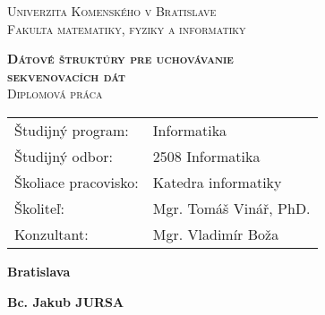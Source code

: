 \newpage
\thispagestyle{empty}

\begin{center}
    \large{
        \textsc{
            Univerzita Komenského v Bratislave \\
            Fakulta matematiky, fyziky a informatiky
        }
    }
\end{center}

\vspace{5cm}

\begin{center}
    \LARGE{
        \textbf{
            \textsc{
                Dátové štruktúry pre uchovávanie \\
                sekvenovacích dát \\
            }
        }
    }
    \vspace{1cm}
    \large{
        \textsc{
            Diplomová práca
        }
    }
\end{center}

\vfill

\begin{center}
    \begin{tabular}{ll}
        Študijný program:               &   Informatika \\
        Študijný odbor:                 &   2508 Informatika \\
        Školiace pracovisko:            &   Katedra informatiky \\
        Školiteľ:                       &   Mgr. Tomáš Vinář, PhD. \\
        Konzultant:                     &   Mgr. Vladimír Boža \\
    \end{tabular}
\end{center}

\vfill

\begin{multicols}{2}
    \begin{flushleft}
        \textbf{Bratislava \the\year}
    \end{flushleft}
    \begin{flushright}
        \textbf{Bc. Jakub JURSA}
    \end{flushright}
\end{multicols}